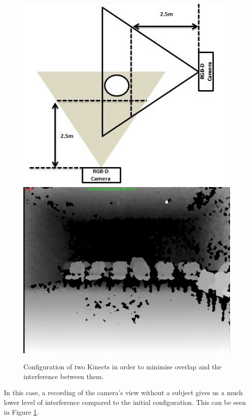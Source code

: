 \documentclass[10pt,a4paper]{article}
\begin{document}
\begin{figure}[H]
\centering
\includegraphics[scale=0.4]{figure_2cameras.jpg}
\includegraphics[scale=0.16]{IR_Interference90deg.jpg}

\caption{Configuration of two Kinects in order to minimise overlap and the interference between them.}
\label{2_cameras_config2}
\end{figure}

\noindent
In this case, a recording of the camera's view without a subject gives us a much lower level of interference compared to the initial configuration. This can be seen in Figure \ref{2_cameras_config2}.
  
\end{document}
